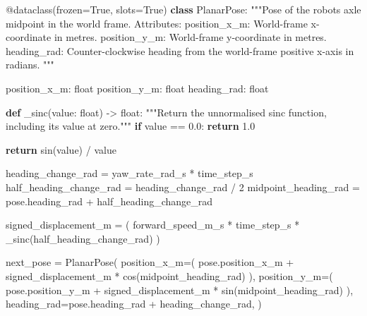 \documentclass[
  australian,
  12pt,
  letterpaper,
  DIV=11,
  numbers=noendperiod,
  twoside]{scrreprt}
\newenvironment{Shaded}{\begin{snugshade}}{\end{snugshade}}
\newcommand{\AttributeTok}[1]{\textcolor[rgb]{0.40,0.45,0.13}{#1}}
\newcommand{\BuiltInTok}[1]{\textcolor[rgb]{0.00,0.23,0.31}{#1}}
\newcommand{\CommentTok}[1]{\textcolor[rgb]{0.37,0.37,0.37}{#1}}
\newcommand{\ControlFlowTok}[1]{\textcolor[rgb]{0.00,0.23,0.31}{\textbf{#1}}}
\newcommand{\DecValTok}[1]{\textcolor[rgb]{0.68,0.00,0.00}{#1}}
\newcommand{\FloatTok}[1]{\textcolor[rgb]{0.68,0.00,0.00}{#1}}
\newcommand{\KeywordTok}[1]{\textcolor[rgb]{0.00,0.23,0.31}{\textbf{#1}}}
\newcommand{\NormalTok}[1]{\textcolor[rgb]{0.00,0.23,0.31}{#1}}
\newcommand{\OperatorTok}[1]{\textcolor[rgb]{0.37,0.37,0.37}{#1}}
\newcommand{\VariableTok}[1]{\textcolor[rgb]{0.07,0.07,0.07}{#1}}
\begin{document}
\begin{Shaded}
\begin{Highlighting}[]
\AttributeTok{@dataclass}\NormalTok{(frozen}\OperatorTok{=}\VariableTok{True}\NormalTok{, slots}\OperatorTok{=}\VariableTok{True}\NormalTok{)}
\KeywordTok{class}\NormalTok{ PlanarPose:}
    \CommentTok{"""Pose of the robot\textquotesingle{}s axle midpoint in the world frame.}
\CommentTok{    }
\CommentTok{    Attributes:}
\CommentTok{        position\_x\_m: World{-}frame x{-}coordinate in metres.}
\CommentTok{        position\_y\_m: World{-}frame y{-}coordinate in metres.}
\CommentTok{        heading\_rad: Counter{-}clockwise heading from the world{-}frame}
\CommentTok{            positive x{-}axis in radians.}
\CommentTok{    """}

\NormalTok{    position\_x\_m: }\BuiltInTok{float}
\NormalTok{    position\_y\_m: }\BuiltInTok{float}
\NormalTok{    heading\_rad: }\BuiltInTok{float}
    

\KeywordTok{def}\NormalTok{ \_sinc(value: }\BuiltInTok{float}\NormalTok{) }\OperatorTok{{-}\textgreater{}} \BuiltInTok{float}\NormalTok{:}
    \CommentTok{"""Return the unnormalised sinc function, including its value at zero."""}
    \ControlFlowTok{if}\NormalTok{ value }\OperatorTok{==} \FloatTok{0.0}\NormalTok{:}
        \ControlFlowTok{return} \FloatTok{1.0}

    \ControlFlowTok{return}\NormalTok{ sin(value) }\OperatorTok{/}\NormalTok{ value}


\NormalTok{heading\_change\_rad }\OperatorTok{=}\NormalTok{ yaw\_rate\_rad\_s }\OperatorTok{*}\NormalTok{ time\_step\_s}
\NormalTok{half\_heading\_change\_rad }\OperatorTok{=}\NormalTok{ heading\_change\_rad }\OperatorTok{/} \DecValTok{2}
\NormalTok{midpoint\_heading\_rad }\OperatorTok{=}\NormalTok{ pose.heading\_rad }\OperatorTok{+}\NormalTok{ half\_heading\_change\_rad}

\NormalTok{signed\_displacement\_m }\OperatorTok{=}\NormalTok{ (}
\NormalTok{    forward\_speed\_m\_s}
    \OperatorTok{*}\NormalTok{ time\_step\_s}
    \OperatorTok{*}\NormalTok{ \_sinc(half\_heading\_change\_rad)}
\NormalTok{)}

\NormalTok{next\_pose }\OperatorTok{=}\NormalTok{ PlanarPose(}
\NormalTok{    position\_x\_m}\OperatorTok{=}\NormalTok{(}
\NormalTok{        pose.position\_x\_m}
        \OperatorTok{+}\NormalTok{ signed\_displacement\_m }\OperatorTok{*}\NormalTok{ cos(midpoint\_heading\_rad)}
\NormalTok{    ),}
\NormalTok{    position\_y\_m}\OperatorTok{=}\NormalTok{(}
\NormalTok{        pose.position\_y\_m}
        \OperatorTok{+}\NormalTok{ signed\_displacement\_m }\OperatorTok{*}\NormalTok{ sin(midpoint\_heading\_rad)}
\NormalTok{    ),}
\NormalTok{    heading\_rad}\OperatorTok{=}\NormalTok{pose.heading\_rad }\OperatorTok{+}\NormalTok{ heading\_change\_rad,}
\NormalTok{)}
\end{Highlighting}
\end{Shaded}
\end{document}

